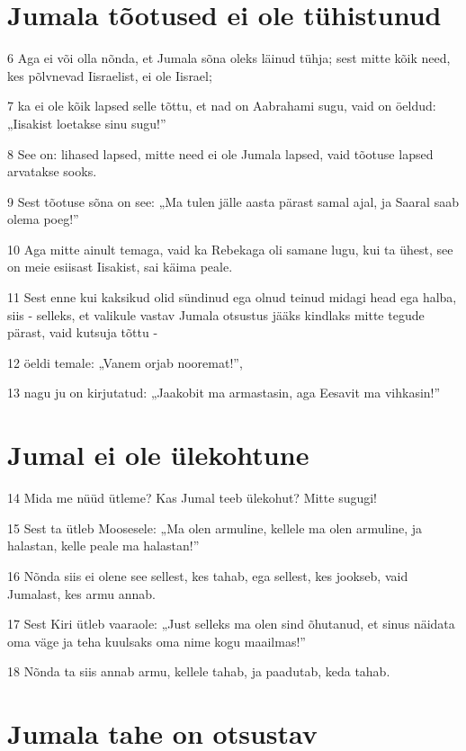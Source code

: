\section*{Jumala tõotused ei ole tühistunud}

\par 6 Aga ei või olla nõnda, et Jumala sõna oleks läinud tühja; sest mitte kõik need, kes põlvnevad Iisraelist, ei ole Iisrael;
\par 7 ka ei ole kõik lapsed selle tõttu, et nad on Aabrahami sugu, vaid on öeldud: „Iisakist loetakse sinu sugu!”
\par 8 See on: lihased lapsed, mitte need ei ole Jumala lapsed, vaid tõotuse lapsed arvatakse sooks.
\par 9 Sest tõotuse sõna on see: „Ma tulen jälle aasta pärast samal ajal, ja Saaral saab olema poeg!”
\par 10 Aga mitte ainult temaga, vaid ka Rebekaga oli samane lugu, kui ta ühest, see on meie esiisast Iisakist, sai käima peale.
\par 11 Sest enne kui kaksikud olid sündinud ega olnud teinud midagi head ega halba, siis - selleks, et valikule vastav Jumala otsustus jääks kindlaks mitte tegude pärast, vaid kutsuja tõttu -
\par 12 öeldi temale: „Vanem orjab nooremat!”,
\par 13 nagu ju on kirjutatud: „Jaakobit ma armastasin, aga Eesavit ma vihkasin!”

\section*{Jumal ei ole ülekohtune}

\par 14 Mida me nüüd ütleme? Kas Jumal teeb ülekohut? Mitte sugugi!
\par 15 Sest ta ütleb Moosesele: „Ma olen armuline, kellele ma olen armuline, ja halastan, kelle peale ma halastan!”
\par 16 Nõnda siis ei olene see sellest, kes tahab, ega sellest, kes jookseb, vaid Jumalast, kes armu annab.
\par 17 Sest Kiri ütleb vaaraole: „Just selleks ma olen sind õhutanud, et sinus näidata oma väge ja teha kuulsaks oma nime kogu maailmas!”
\par 18 Nõnda ta siis annab armu, kellele tahab, ja paadutab, keda tahab.

\section*{Jumala tahe on otsustav}

